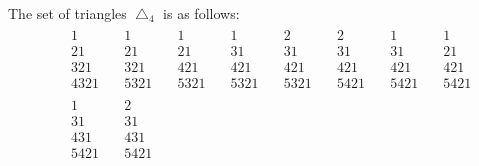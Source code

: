 \begin{ex} 
The set of triangles ${\bigtriangleup}_4$ is as follows:
\begin{eqnarray*}
&&\begin{array}{c}
1\\21\\321\\4321
\end{array}{\quad}
\begin{array}{c}
1\\21\\321\\5321
\end{array}{\quad}
\begin{array}{c}
1\\21\\421\\5321
\end{array}{\quad}
\begin{array}{c}
1\\31\\421\\5321
\end{array}{\quad}
\begin{array}{c}
2\\31\\421\\5321
\end{array}{\quad}
\begin{array}{c}
2\\31\\421\\5421
\end{array}{\quad}
\begin{array}{c}
1\\31\\421\\5421
\end{array}{\quad}
\begin{array}{c}
1\\21\\421\\5421
\end{array}\\
&&\begin{array}{c}
1\\31\\431\\5421
\end{array}{\quad}
\begin{array}{c}
2\\31\\431\\5421

\end{array}
\end{eqnarray*}
\end{ex}

